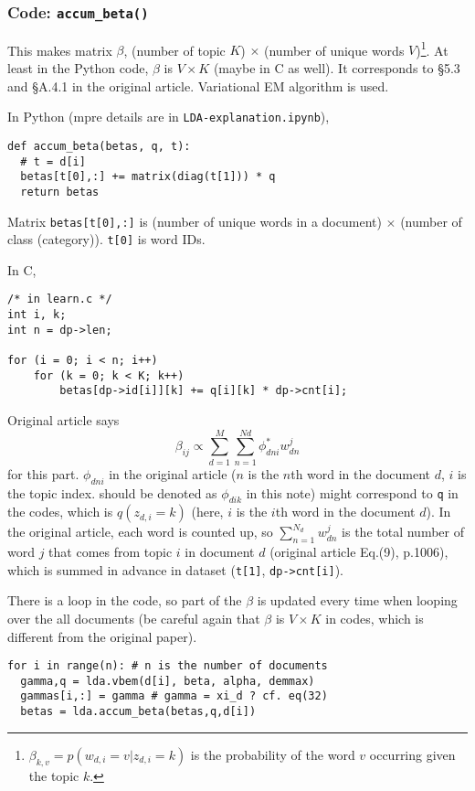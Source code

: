 \documentclass[a4paper,10.5pt,dvipdfmx]{jarticle}  %
\begin{document}
\subsubsection{Code: \texttt{accum\_beta()}}
\noindent
This makes matrix $\beta$, (number of topic $K$) $\times$ (number of unique words $V$)\footnote[2]{$\beta_{k,v} = p(w_{d,i} = v|z_{d,i}=k)$ is the probability of the word $v$ occurring given the topic $k$.}. At least in the Python code, $\beta$ is $V \times K$ (maybe in C as well). It corresponds to \S5.3 and \S A.4.1 in the original article. Variational EM algorithm is used. \par
In Python (mpre details are in \texttt{LDA-explanation.ipynb}),
\begin{lstlisting}[style=Python]
def accum_beta(betas, q, t):
  # t = d[i]
  betas[t[0],:] += matrix(diag(t[1])) * q        
  return betas 
\end{lstlisting}
Matrix \texttt{betas[t[0],:]} is (number of unique words in a document) $\times$  (number of class (category)). \texttt{t[0]} is word IDs.

In C,
\begin{lstlisting}[style=C]
/* in learn.c */
int i, k;
int n = dp->len;

for (i = 0; i < n; i++)
	for (k = 0; k < K; k++)
		betas[dp->id[i]][k] += q[i][k] * dp->cnt[i];
\end{lstlisting}
Original article says \begin{equation} \beta_{ij} \propto \sum_{d=1}^{M} \sum_{n=1}^{Nd} \phi_{dni}^{*} w_{dn}^{j} \end{equation} for this part. $\phi_{dni}$ in the original article ($n$ is the $n$th word in the document $d$, $i$ is the topic index. should be denoted as $\phi_{dik}$ in this note) might correspond to \texttt{q} in the codes, which is $q(z_{d,i}=k)$ (here, $i$ is the $i$th word in the document $d$). In the original article, each word is counted up, so $\sum_{n=1}^{N_d} w_{dn}^{j}$ is the total number of word $j$ that comes from topic $i$ in document $d$ (original article Eq.(9), p.1006), which is summed in advance in dataset (\texttt{t[1]}, \texttt{dp->cnt[i]}).\par
There is a loop in the code, so part of the $\beta$ is updated every time when looping over the all documents (be careful again that $\beta$ is $V \times K$ in codes, which is different from the original paper).
\begin{lstlisting}[style=Python]
for i in range(n): # n is the number of documents
  gamma,q = lda.vbem(d[i], beta, alpha, demmax)
  gammas[i,:] = gamma # gamma = xi_d ? cf. eq(32)
  betas = lda.accum_beta(betas,q,d[i])
\end{lstlisting}
\end{document}
